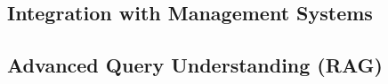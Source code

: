 \subsection{Integration with Management Systems}



\subsection{Advanced Query Understanding (RAG)}



